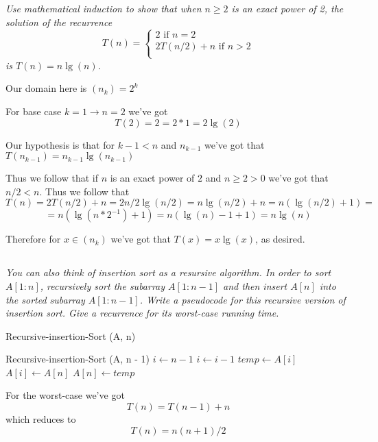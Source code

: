 \documentclass[11pt,oneside,titlepage]{book}
\begin{document}
\textit{Use mathematical induction to show that when $n \geq 2$ is an exact power of 2, the
  solution of the recurrence }
$$T(n) =
\begin{cases}
  2 \text{ if }n = 2 \\
  2T(n/2) + n \text{ if } n > 2\\
\end{cases}
$$
\textit{is $T(n) = n \lg(n)$.}

Our domain here is $(n_k) = 2^k$

For base case $k = 1 \to n = 2$ we've got
$$T(2) = 2 = 2 * 1 = 2 \lg(2)$$

Our hypothesis is that for $k - 1 < n$ and $n_{k - 1}$ we've got that
$T(n_{k - 1}) = n_{k - 1} \lg(n_{k - 1})$

Thus we follow that if $n$ is an exact power of $2$ and $n \geq 2 > 0$ we've got that
$n/2 < n$. Thus we follow that
$$T(n) = 2T(n/2) + n = 2 n/2 \lg(n/2) = n \lg(n/2) + n = n(\lg(n/2) + 1) =$$
$$= n(\lg(n * 2^{-1}) + 1) =
n(\lg(n) - 1 + 1) = n \lg(n)$$

Therefore for $x \in (n_k)$ we've got that $T(x) = x \lg(x)$, as desired.

\subsection{}

\textit{You can also think of insertion sort as a resursive algorithm. In order to sort
  $A[1:n]$, recursively sort the subarray $A[1:n - 1]$ and then insert $A[n]$ into the
  sorted subarray $A[1: n - 1]$. Write a pseudocode for this recursive version of insertion
  sort. Give a recurrence for its worst-case running time.}

\begin{function}
  \caption{Recursive-insertion-Sort (A, n)}
  Recursive-insertion-Sort (A, n - 1)\;
  $i \leftarrow n - 1$ \;
  {
    $i \leftarrow i - 1$
  }
  $temp \leftarrow A[i]$ \;
  $A[i] \leftarrow A[n]$ \;
  $A[n] \leftarrow temp$ \;
\end{function}

For the worst-case we've got
$$T(n) = T(n - 1) + n$$
which reduces to
$$T(n) = n(n + 1)/2$$


\subsection{}
\end{document}
